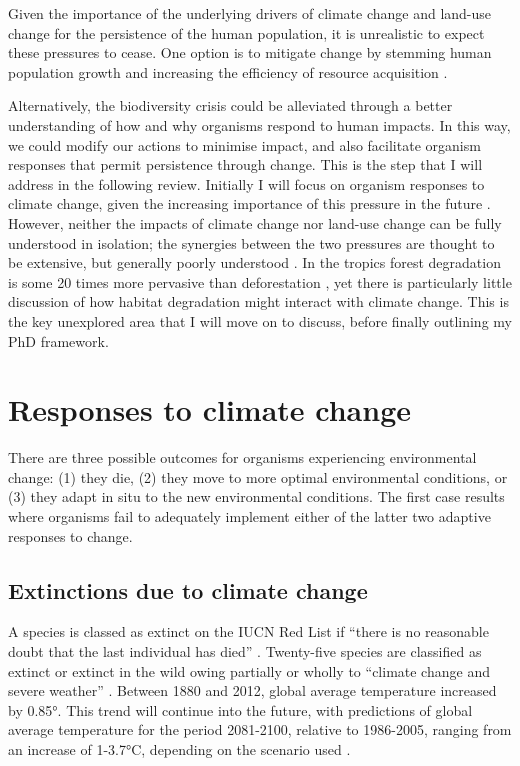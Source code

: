 \documentclass[12pt,a4paper,]{report}
\theoremstyle{definition}
\theoremstyle{definition}
\theoremstyle{definition}
\theoremstyle{remark}
\begin{document}
Given the importance of the underlying drivers of climate change and
land-use change for the persistence of the human population, it is
unrealistic to expect these pressures to cease. One option is to
mitigate change by stemming human population growth and increasing the
efficiency of resource acquisition \citep{godfray_food2010}.

Alternatively, the biodiversity crisis could be alleviated through a
better understanding of how and why organisms respond to human impacts.
In this way, we could modify our actions to minimise impact, and also
facilitate organism responses that permit persistence through change.
This is the step that I will address in the following review. Initially
I will focus on organism responses to climate change, given the
increasing importance of this pressure in the future
\citep{sala_global2000}. However, neither the impacts of climate change
nor land-use change can be fully understood in isolation; the synergies
between the two pressures are thought to be extensive, but generally
poorly understood
\citep{brodie_climate2012, mantyka-pringle_interactions2012}. In the
tropics forest degradation is some 20 times more pervasive than
deforestation \citep{asner_contemporary2009}, yet there is particularly
little discussion of how habitat degradation might interact with climate
change. This is the key unexplored area that I will move on to discuss,
before finally outlining my PhD framework.

\section{Responses to climate change}\label{responses-to-climate-change}

There are three possible outcomes for organisms experiencing
environmental change: (1) they die, (2) they move to more optimal
environmental conditions, or (3) they adapt in situ to the new
environmental conditions. The first case results where organisms fail to
adequately implement either of the latter two adaptive responses to
change.

\subsection{Extinctions due to climate
change}\label{extinctions-due-to-climate-change}

A species is classed as extinct on the IUCN Red List if ``there is no
reasonable doubt that the last individual has died''
\citep{baillie2004}. Twenty-five species are classified as extinct or
extinct in the wild owing partially or wholly to ``climate change and
severe weather'' \citep{iucn_iucn2014}. Between 1880 and 2012, global
average temperature increased by 0.85°. This trend will continue into
the future, with predictions of global average temperature for the
period 2081-2100, relative to 1986-2005, ranging from an increase of
1-3.7°C, depending on the scenario used \citep{ipcc2013}.
\end{document}
